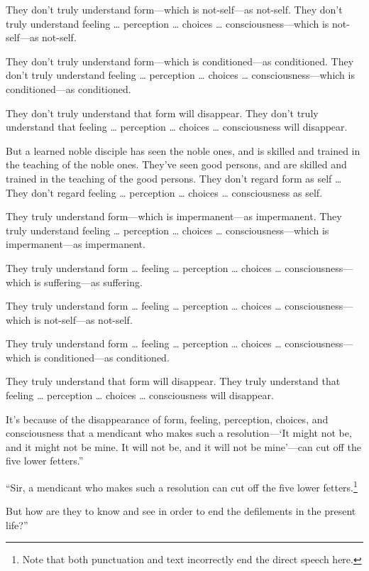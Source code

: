 \documentclass[12pt,openany]{book}%
\begin{document}
They don’t truly understand form—which is not-self—as not-self. They don’t truly understand feeling … perception … choices … consciousness—which is not-self—as not-self. 

They don’t truly understand form—which is conditioned—as conditioned. They don’t truly understand feeling … perception … choices … consciousness—which is conditioned—as conditioned. 

They don’t truly understand that form will disappear. They don’t truly understand that feeling … perception … choices … consciousness will disappear. 

But a learned noble disciple has seen the noble ones, and is skilled and trained in the teaching of the noble ones. They’ve seen good persons, and are skilled and trained in the teaching of the good persons. They don’t regard form as self … They don’t regard feeling … perception … choices … consciousness as self. 

They truly understand form—which is impermanent—as impermanent. They truly understand feeling … perception … choices … consciousness—which is impermanent—as impermanent. 

They truly understand form … feeling … perception … choices … consciousness—which is suffering—as suffering. 

They truly understand form … feeling … perception … choices … consciousness—which is not-self—as not-self. 

They truly understand form … feeling … perception … choices … consciousness—which is conditioned—as conditioned. 

They truly understand that form will disappear. They truly understand that feeling … perception … choices … consciousness will disappear. 

It’s because of the disappearance of form, feeling, perception, choices, and consciousness that a mendicant who makes such a resolution—‘It might not be, and it might not be mine. It will not be, and it will not be mine’—can cut off the five lower fetters.” 

“Sir, a mendicant who makes such a resolution can cut off the five lower fetters.\footnote{Note that both punctuation and text incorrectly end the direct speech here. } 

But how are they to know and see in order to end the defilements in the present life?” 
\end{document}

